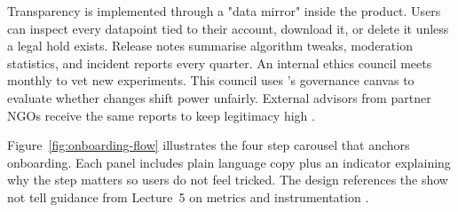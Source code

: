Transparency is implemented through a "data mirror" inside the product. Users can inspect every datapoint tied to their account, download it, or delete it unless a legal hold exists. Release notes summarise algorithm tweaks, moderation statistics, and incident reports every quarter. An internal ethics council meets monthly to vet new experiments. This council uses \citet{Reillier2017}'s governance canvas to evaluate whether changes shift power unfairly. External advisors from partner NGOs receive the same reports to keep legitimacy high \citep{Srnicek2017}.

Figure~\ref{fig:onboarding-flow} illustrates the four step carousel that anchors onboarding. Each panel includes plain language copy plus an indicator explaining why the step matters so users do not feel tricked. The design references the show not tell guidance from Lecture~5 on metrics and instrumentation \citep{Lecture05}.


